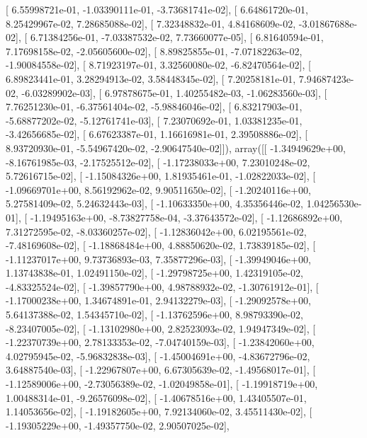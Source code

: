 \documentclass{article}
\begin{document}
       [  6.55998721e-01,  -1.03390111e-01,  -3.73681741e-02],
       [  6.64861720e-01,   8.25429967e-02,   7.28685088e-02],
       [  7.32348832e-01,   4.84168609e-02,  -3.01867688e-02],
       [  6.71384256e-01,  -7.03387532e-02,   7.73660077e-05],
       [  6.81640594e-01,   7.17698158e-02,  -2.05605600e-02],
       [  8.89825855e-01,  -7.07182263e-02,  -1.90084558e-02],
       [  8.71923197e-01,   3.32560080e-02,  -6.82470564e-02],
       [  6.89823441e-01,   3.28294913e-02,   3.58448345e-02],
       [  7.20258181e-01,   7.94687423e-02,  -6.03289902e-03],
       [  6.97878675e-01,   1.40255482e-03,  -1.06283560e-03],
       [  7.76251230e-01,  -6.37561404e-02,  -5.98846046e-02],
       [  6.83217903e-01,  -5.68877202e-02,  -5.12761741e-03],
       [  7.23070692e-01,   1.03381235e-01,  -3.42656685e-02],
       [  6.67623387e-01,   1.16616981e-01,   2.39508886e-02],
       [  8.93720930e-01,  -5.54967420e-02,  -2.90647540e-02]]), array([[ -1.34949629e+00,  -8.16761985e-03,  -2.17525512e-02],
       [ -1.17238033e+00,   7.23010248e-02,   5.72616715e-02],
       [ -1.15084326e+00,   1.81935461e-01,  -1.02822033e-02],
       [ -1.09669701e+00,   8.56192962e-02,   9.90511650e-02],
       [ -1.20240116e+00,   5.27581409e-02,   5.24632443e-03],
       [ -1.10633350e+00,   4.35356446e-02,   1.04256530e-01],
       [ -1.19495163e+00,  -8.73827758e-04,  -3.37643572e-02],
       [ -1.12686892e+00,   7.31272595e-02,  -8.03360257e-02],
       [ -1.12836042e+00,   6.02195561e-02,  -7.48169608e-02],
       [ -1.18868484e+00,   4.88850620e-02,   1.73839185e-02],
       [ -1.11237017e+00,   9.73736893e-03,   7.35877296e-03],
       [ -1.39949046e+00,   1.13743838e-01,   1.02491150e-02],
       [ -1.29798725e+00,   1.42319105e-02,  -4.83325524e-02],
       [ -1.39857790e+00,   4.98788932e-02,  -1.30761912e-01],
       [ -1.17000238e+00,   1.34674891e-01,   2.94132279e-03],
       [ -1.29092578e+00,   5.64137388e-02,   1.54345710e-02],
       [ -1.13762596e+00,   8.98793390e-02,  -8.23407005e-02],
       [ -1.13102980e+00,   2.82523093e-02,   1.94947349e-02],
       [ -1.22370739e+00,   2.78133353e-02,  -7.04740159e-03],
       [ -1.23842060e+00,   4.02795945e-02,  -5.96832838e-03],
       [ -1.45004691e+00,  -4.83672796e-02,   3.64887540e-03],
       [ -1.22967807e+00,   6.67305639e-02,  -1.49568017e-01],
       [ -1.12589006e+00,  -2.73056389e-02,  -1.02049858e-01],
       [ -1.19918719e+00,   1.00488314e-01,  -9.26576098e-02],
       [ -1.40678516e+00,   1.43405507e-01,   1.14053656e-02],
       [ -1.19182605e+00,   7.92134060e-02,   3.45511430e-02],
       [ -1.19305229e+00,  -1.49357750e-02,   2.90507025e-02],
\end{document}
